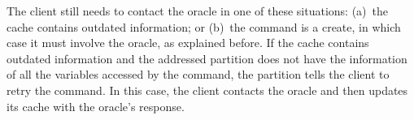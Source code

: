 The client still needs to contact the oracle in one of these situations:
(a)~the cache contains outdated information; or
(b)~the command is a create, in which case it must involve the oracle, as explained before.
If the cache contains outdated information and the addressed partition does not have the information of all the variables accessed by the command, the partition tells the client to retry the command.
In this case, the client contacts the oracle and then updates its cache with the oracle's response.







